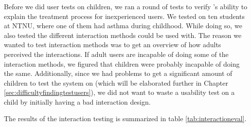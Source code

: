 Before we did user tests on children, we ran a round of tests to verify \ab{}'s ability to explain the treatment process for inexperienced users. We tested on ten students at NTNU, where one of them had asthma during childhood. While doing so, we also tested the different interaction methods \ab{} could be used with. The reason we wanted to test interaction methods was to get an overview of how adults perceived the interactions. If adult users are incapable of doing some of the interaction methods, we figured that children were probably incapable of doing the same. Additionally, since we had problems to get a significant amount of children to test the system on (which will be elaborated further in Chapter \ref{sec:difficultyfindingtestusers}), we did not want to waste a usability test on a child by initially having a bad interaction design.         

The results of the interaction testing is summarized in table \ref{tab:interactioneval}.  

